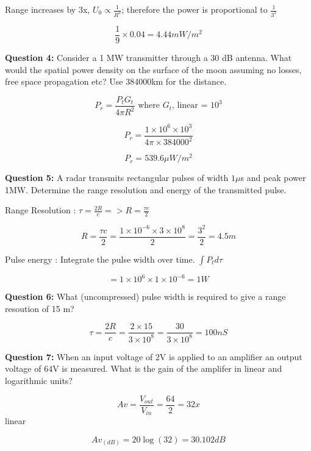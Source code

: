 \documentclass[a4paper,12pt]{article} %
\begin{document}
\vspace*{1ex}
Range increases by 3x, $U_0 \propto \frac{1}{R^2}$; therefore the power is proportional to $\frac{1}{3^2}$
\vspace*{1ex}

$$\frac{1}{9}\times 0.04 = 4.44 mW/m^2 $$

\vspace{1ex}
\textbf{Question 4:} Consider a 1 MW transmitter through a 30 dB antenna. What would the spatial power density on the surface of the moon assuming no losses, free space propagation etc? Use 384000km for the distance.

\vspace*{1ex}
$$P_r = \frac{P_t G_t}{4\pi R^2} \text{    where $G_t$, linear = $10^3$}$$ 

$$P_r = \frac{1\times10^6 \times10^3}{4\pi \times384000^2}$$

\vspace*{1ex}
$$P_r = 539.6 \mu W/m^2$$


\vspace{1ex}
\textbf{Question 5:} A radar transmits rectangular pulses of width $1 \mu$s and peak power 1MW. Determine the range resolution and energy of the transmitted pulse.

\vspace*{1ex}
Range Resolution : $\tau = \frac{2R}{c} => R = \frac{\tau c}{2}$

$$ R = \frac{\tau c}{2} = \frac{1\times10^{-6} \times 3\times10^8}{2} = \frac{3^2}{2} = 4.5m $$

\vspace*{1ex}
Pulse energy : Integrate the pulse width over time. $\int P_t d\tau$

$$ = 1\times10^6\times1\times10^{-6} = 1W$$


\vspace{1ex}
\textbf{Question 6:} What (uncompressed) pulse width is required to give a range resoution of 15 m?

\vspace*{1ex}
$$\tau = \frac{2R}{c} = \frac{2\times 15}{3\times10^8} = \frac{30}{3\times10^8} = 100 nS$$


\vspace{2ex}
\textbf{Question 7:}
 When an input voltage of 2V is applied to an amplifier an output voltage of 64V is measured. What is the gain of the amplifer in linear and logarithmic units?

 \vspace*{1ex}

 $$Av = \frac{V_{out}}{V_{in}} = \frac{64}{2} = 32x $$ linear

 $$Av_{(dB)} = 20 \log (32) = 30.102 dB$$
\end{document}
